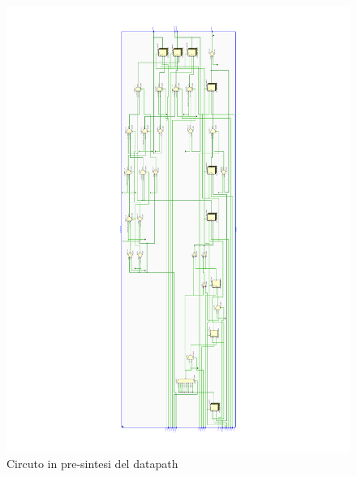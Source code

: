 \documentclass[12pt]{article} %
\begin{document}
			\begin{figure}[H]
				\centering
				\includegraphics[width=1.1\textwidth]{RTL_DataPath_Schematic.pdf}
				\caption{Circuto in pre-sintesi del datapath}
				\label{fig:Schematic_RTL_DataPath}
			\end{figure}
\end{document}
